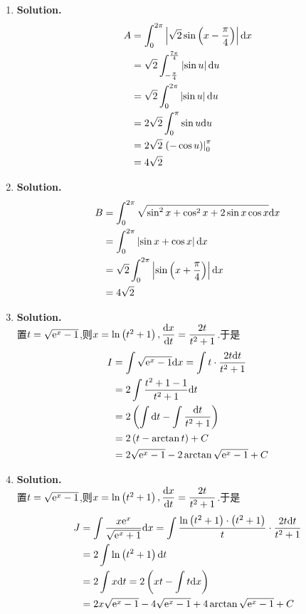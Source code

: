 \documentclass{ctexart}
\begin{document}
\begin{solution}
    \begin{enumerate}[label=\textbf{(\arabic*)}]
        \item \textbf{Solution.}
            $$\begin{aligned}
                A
                &= \int_{0}^{2\pi}\left|\sqrt{2}\sin\left(x-\dfrac{\pi}{4}\right)\right|\mathrm{d} x \\
                &= \sqrt{2}\int_{-\frac{\pi}{4}}^{\frac{7\pi}{4}}\left|\sin u\right|\mathrm{d} u \\
                &= \sqrt{2}\int_{0}^{2\pi}\left|\sin u\right|\mathrm{d} u\\
                &= 2\sqrt{2}\int_{0}^{\pi}\sin u\mathrm{d} u \\
                &= 2\sqrt{2}\left.\left(-\cos u\right)\right|_{0}^{\pi} \\
                &= 4\sqrt{2}
            \end{aligned}$$
        \item \textbf{Solution.}
            $$\begin{aligned}
                B
                &= \int_{0}^{2\pi}\sqrt{\sin^2x+\cos^2x+2\sin x\cos x}\mathrm{d} x \\
                &= \int_{0}^{2\pi}\left|\sin x+\cos x\right|\mathrm{d} x \\
                &= \sqrt{2}\int_0^{2\pi}\left|\sin\left(x+\dfrac{\pi}{4}\right)\right|\mathrm{d} x \\
                &= 4\sqrt{2}
            \end{aligned}$$
        \item \textbf{Solution.}\\
            置$t=\sqrt{\mathrm{e}^x-1}$,则$x=\ln\left(t^2+1\right),\dfrac{\mathrm{d} x}{\mathrm{d} t}=\dfrac{2t}{t^2+1}$.于是
            $$\begin{aligned}
                I
                &= \int\sqrt{\mathrm{e}^x-1}\mathrm{d} x=\int t\cdot\dfrac{2t\mathrm{d} t}{t^2+1} \\
                &= 2\int\dfrac{t^2+1-1}{t^2+1}\mathrm{d} t \\
                &= 2\left(\int\mathrm{d} t-\int\dfrac{\mathrm{d} t}{t^2+1}\right) \\
                &= 2\left(t-\arctan t\right)+C \\
                &= 2\sqrt{\mathrm{e}^x-1}-2\arctan\sqrt{\mathrm{e}^x-1}+C
            \end{aligned}$$
        \item \textbf{Solution.}\\
            置$t=\sqrt{\mathrm{e}^x-1}$,则$x=\ln\left(t^2+1\right),\dfrac{\mathrm{d} x}{\mathrm{d} t}=\dfrac{2t}{t^2+1}$.于是
            $$\begin{aligned}
                J
                &= \int\dfrac{x\mathrm{e}^x}{\sqrt{\mathrm{e}^x+1}}\mathrm{d} x =\int\dfrac{\ln\left(t^2+1\right)\cdot\left(t^2+1\right)}{t}\cdot\dfrac{2t\mathrm{d} t}{t^2+1} \\
                &= 2\int\ln\left(t^2+1\right)\mathrm{d} t\\
                &= 2\int x\mathrm{d} t=2\left(xt-\int t\mathrm{d} x\right) \\
                &= 2x\sqrt{\mathrm{e}^x-1}-4\sqrt{\mathrm{e}^x-1}+4\arctan\sqrt{\mathrm{e}^x-1}+C
            \end{aligned}$$
    \end{enumerate}
\end{solution}
\end{document}

